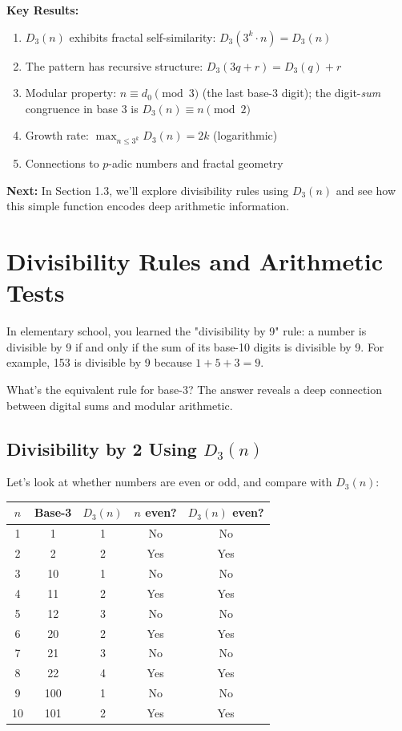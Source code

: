 \textbf{Key Results:}
\begin{enumerate}
\item $D_3(n)$ exhibits fractal self-similarity: $D_3(3^k \cdot n) = D_3(n)$
\item The pattern has recursive structure: $D_3(3q + r) = D_3(q) + r$
\item Modular property: $n \equiv d_0 \pmod{3}$ (the last base-3 digit); the digit-\emph{sum} congruence in base 3 is $D_3(n) \equiv n \pmod{2}$
\item Growth rate: $\max_{n \leq 3^k} D_3(n) = 2k$ (logarithmic)
\item Connections to $p$-adic numbers and fractal geometry
\end{enumerate}

\textbf{Next:} In Section 1.3, we'll explore divisibility rules using $D_3(n)$ and see how this simple function encodes deep arithmetic information.

\section{Divisibility Rules and Arithmetic Tests}
\label{sec:divisibility-rules}

In elementary school, you learned the "divisibility by 9" rule: a number is divisible by 9 if and only if the sum of its base-10 digits is divisible by 9. For example, 153 is divisible by 9 because $1 + 5 + 3 = 9$.

What's the equivalent rule for base-3? The answer reveals a deep connection between digital sums and modular arithmetic.

\subsection{Divisibility by 2 Using \texorpdfstring{$D_3(n)$}{D\_3(n)}}
\label{subsec:divisibility-by-2}


Let's look at whether numbers are even or odd, and compare with $D_3(n)$:

\begin{center}
\begin{tabular}{c|c|c|c|c}
$n$ & Base-3 & $D_3(n)$ & $n$ even? & $D_3(n)$ even? \\
\hline
1 & 1 & 1 & No & No \\
2 & 2 & 2 & Yes & Yes \\
3 & 10 & 1 & No & No \\
4 & 11 & 2 & Yes & Yes \\
5 & 12 & 3 & No & No \\
6 & 20 & 2 & Yes & Yes \\
7 & 21 & 3 & No & No \\
8 & 22 & 4 & Yes & Yes \\
9 & 100 & 1 & No & No \\
10 & 101 & 2 & Yes & Yes \\
\end{tabular}
\end{center}

